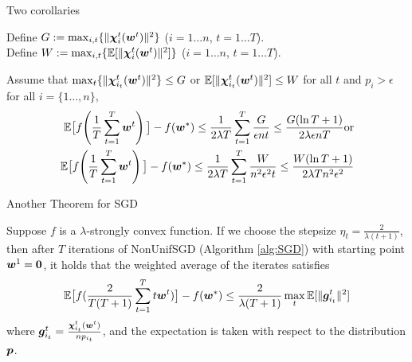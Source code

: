 
\begin{frame}{Two corollaries}
\begin{definition}\label{def:WG}
Define $G := \max_{i, t}\{ \|\bm{\chi}_{i}^t(\bm{w}^{t})\|^2\}$ ($i = 1\dots n$, $t=1\dots T$). \\
Define $W := \max_{i,t}\{\mathbb{E}[\|\bm{\chi}_{i}^t(\bm{w}^{t})\|^2]\}$ ($i = 1\dots n$, $t=1\dots T$).
\end{definition}
\begin{corollary}\label{corollary:maxsubgrad}
Assume that $\max_{t}\{\|\bm{\chi}_{i_t}^t(\bm{w}^t)\|^2\} \le G$ or $\mathbb{E}[\|\bm{\chi}_{i_t}^t(\bm{w}^t)\|^2] \le W$ for all $t$ and $p_i > \epsilon$ for all $i=\{1\dots, n\}$,
    \begin{align*}
        \mathbb{E}\big[f\!\left(\frac1T\sum_{t=1}^T \bm{w}^{t} \right)\big]- f(\bm{w}^*) \le \frac{1}{2\lambda T} \sum_{t=1}^T \frac{G}{\epsilon nt}
\le \frac{G(\ln T+1)}{2\lambda \epsilon nT} \text{or}\\ 
        \mathbb{E}\big[f\!\left(\frac1T\sum_{t=1}^T \bm{w}^{t} \right)\big]- f(\bm{w}^*)  \le \frac{1}{2\lambda T}\sum_{t=1}^T \frac{W}{n^2\epsilon^2 t}
\le \frac{W(\ln T+1)}{2\lambda Tn^2\epsilon^2}
    \end{align*}
\end{corollary}
\end{frame}

\begin{frame}{Another Theorem for SGD}
\begin{theorem}\label{theorem:weightedSGD}
    Suppose $f$ is a $\lambda$-strongly convex function. If we choose the stepsize $\eta_t=\frac{2}{\lambda (t+1)}$, then after $T$ iterations of NonUnifSGD (Algorithm \ref{alg:SGD}) with starting point $\bm{w}^{1}=\bm{0}$, it holds that the weighted average of the iterates satisfies
    \[
        \mathbb{E}\big[f(\frac{2}{T(T+1)}\sum_{t=1}^{T}t \bm{w}^{t})\big] - f(\bm{w}^*) \le 
        \frac{2}{\lambda(T+1)} \max_{t} \mathbb{E}[\|\bm{g}_{i_t}^t\|^2]
    \]
    where $\bm{g}_{i_t}^t=\frac{\bm{\chi}_{i_t}^t(\bm{w}^{t})}{np_{i_t}}$,
    and the expectation is taken with respect to the distribution $\bm{p}$.
\end{theorem}
\end{frame}

